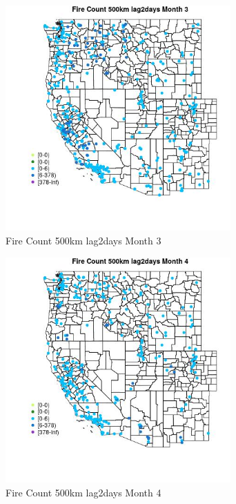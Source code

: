 \begin{figure} 
\centering  
\includegraphics[width=0.77\textwidth]{Code_Outputs/Report_ML_input_PM25_Step4_part_e_de_duplicated_aves_compiled_2019-05-18wNAs_MapObsMo3Fire_Count_500km_lag2days.jpg} 
\caption{\label{fig:Report_ML_input_PM25_Step4_part_e_de_duplicated_aves_compiled_2019-05-18wNAsMapObsMo3Fire_Count_500km_lag2days}Fire Count 500km lag2days Month 3} 
\end{figure} 
 

\clearpage 

\begin{figure} 
\centering  
\includegraphics[width=0.77\textwidth]{Code_Outputs/Report_ML_input_PM25_Step4_part_e_de_duplicated_aves_compiled_2019-05-18wNAs_MapObsMo4Fire_Count_500km_lag2days.jpg} 
\caption{\label{fig:Report_ML_input_PM25_Step4_part_e_de_duplicated_aves_compiled_2019-05-18wNAsMapObsMo4Fire_Count_500km_lag2days}Fire Count 500km lag2days Month 4} 
\end{figure} 
 

